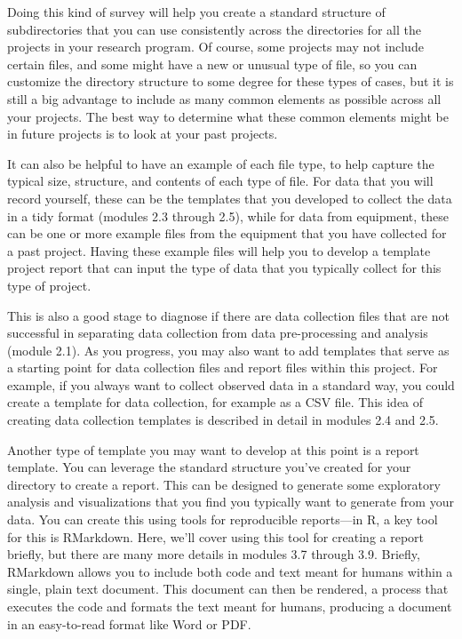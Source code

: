 \documentclass[]{tufte-book}
\begin{document}
Doing this kind of survey will help you create a standard structure of
subdirectories that you can use consistently across the directories for all the
projects in your research program. Of course, some projects may not include
certain files, and some might have a new or unusual type of file, so you can
customize the directory structure to some degree for these types of cases, but
it is still a big advantage to include as many common elements as possible
across all your projects. The best way to determine what these common elements
might be in future projects is to look at your past projects.

It can also be helpful to have an example of each file type, to help capture
the typical size, structure, and contents of each type of file. For
data that you will record yourself, these can be the templates that you
developed to collect the data in a tidy format (modules 2.3 through 2.5), while
for data from equipment, these can be one or more example files from the
equipment that you have collected for a past project. Having these example files
will help you to develop a template project report that can input the type of
data that you typically collect for this type of project.

This is also a good stage to diagnose if there are data collection files that
are not successful in separating data collection from data pre-processing and
analysis (module 2.1). As you progress, you may also want to add templates that
serve as a starting point for data collection files and report files within this
project. For example, if you always want to collect observed data in a standard
way, you could create a template for data collection, for example as a CSV file.
This idea of creating data collection templates is described in detail in
modules 2.4 and 2.5.

Another type of template you may want to develop at this point is a report
template. You can leverage the standard structure you've created for your
directory to create a report. This can be designed to generate some exploratory
analysis and visualizations that you find you typically want to generate from
your data. You can create this using tools for reproducible reports---in R, a
key tool for this is RMarkdown. Here, we'll cover using this tool for creating a
report briefly, but there are many more details in modules 3.7 through 3.9.
Briefly, RMarkdown allows you to include both code and text meant for humans
within a single, plain text document. This document can then be rendered, a
process that executes the code and formats the text meant for humans, producing
a document in an easy-to-read format like Word or PDF.
\end{document}
